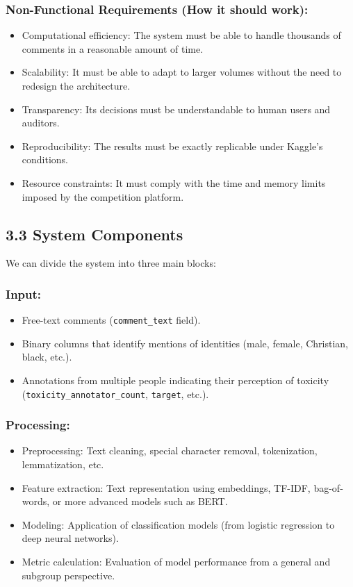 \documentclass[a4paper,12pt]{article}
\begin{document}
\subsubsection*{Non-Functional Requirements (How it should work):}
\begin{itemize}
    \item Computational efficiency: The system must be able to handle thousands of comments in a reasonable amount of time.
    \item Scalability: It must be able to adapt to larger volumes without the need to redesign the architecture.
    \item Transparency: Its decisions must be understandable to human users and auditors.
    \item Reproducibility: The results must be exactly replicable under Kaggle's conditions.
    \item Resource constraints: It must comply with the time and memory limits imposed by the competition platform.
\end{itemize}

\subsection*{3.3 System Components}

We can divide the system into three main blocks:

\subsubsection*{Input:}
\begin{itemize}
    \item Free-text comments (\texttt{comment\_text} field).
    \item Binary columns that identify mentions of identities (male, female, Christian, black, etc.).
    \item Annotations from multiple people indicating their perception of toxicity (\texttt{toxicity\_annotator\_count}, \texttt{target}, etc.).
\end{itemize}

\subsubsection*{Processing:}
\begin{itemize}
    \item Preprocessing: Text cleaning, special character removal, tokenization, lemmatization, etc.
    \item Feature extraction: Text representation using embeddings, TF-IDF, bag-of-words, or more advanced models such as BERT.
    \item Modeling: Application of classification models (from logistic regression to deep neural networks).
    \item Metric calculation: Evaluation of model performance from a general and subgroup perspective.
\end{itemize}
\end{document}
